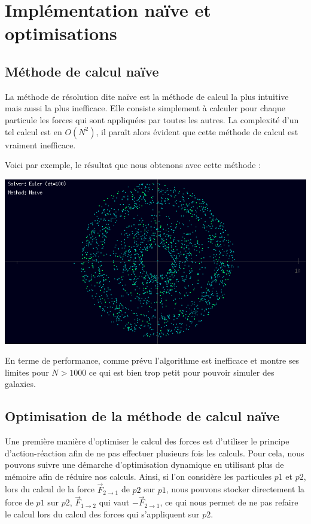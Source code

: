 \chapter{Implémentation naïve et optimisations}

\section{Méthode de calcul naïve}

La méthode de résolution dite naïve est la méthode de calcul la plus intuitive mais aussi la plus inefficace. Elle consiste simplement à calculer pour chaque particule les forces qui sont appliquées par toutes les autres. La complexité d'un tel calcul est en $O(N^2)$, il paraît alors évident que cette méthode de calcul est vraiment inefficace.

Voici par exemple, le résultat que nous obtenons avec cette méthode :

\begin{center}
\includegraphics[scale=0.8]{images/naive.png}
\captionsetup{hypcap=false}
\label{fig2}
\end{center}

En terme de performance, comme prévu l'algorithme est inefficace et montre ses limites pour $N>1000$ ce qui est bien trop petit pour pouvoir simuler des galaxies.

\section{Optimisation de la méthode de calcul naïve}
\vspace{2mm}

Une première manière d'optimiser le calcul des forces est d'utiliser le principe d'action-réaction afin de ne pas effectuer plusieurs fois les calculs.
Pour cela, nous pouvons suivre une démarche d'optimisation dynamique en utilisant plus de mémoire afin de réduire nos calculs. Ainsi, si l'on considère les particules $p1$ et $p2$, lors du calcul de la force $\vec{F}_{2 \rightarrow 1}$ de $p2$ sur $p1$, nous pouvons stocker directement la force de $p1$ sur $p2$, $\vec{F}_{1 \rightarrow 2}$ qui vaut $-\vec{F}_{2 \rightarrow 1}$, ce qui nous permet de ne pas refaire le calcul lors du calcul des forces qui s'appliquent sur $p2$.

